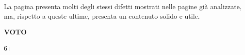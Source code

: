 La pagina presenta molti degli stessi difetti mostrati nelle pagine già analizzate, ma, rispetto a queste ultime, presenta un contenuto solido e utile.
\begin{center}
    \begin{Large}
    \textbf{VOTO}\\
    \vspace{0.1cm}
    \end{Large}
    \begin{huge}
    6+
    \end{huge}
\end{center}